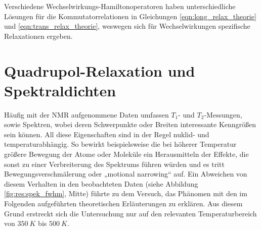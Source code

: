 Verschiedene Wechselwirkungs-Hamiltonoperatoren haben unterschiedliche Lösungen für die Kommutatorrelationen in Gleichungen \eqref{eqn:long_relax_theorie} und \eqref{eqn:trans_relax_theorie}, weswegen sich für Wechselwirkungen spezifische Relaxationen ergeben.




\section{Quadrupol-Relaxation und Spektraldichten} \label{section:theo:eckert}

Häufig mit der NMR aufgenommene Daten umfassen $T_1$- und $T_2$-Messungen, sowie Spektren, wobei deren Schwerpunkte oder Breiten interessante Kenngrößen sein können. All diese Eigenschaften sind in der Regel nuklid- und temperaturabhängig. So bewirkt beispielsweise die bei höherer Temperatur größere Bewegung der Atome oder Moleküle ein Herausmitteln der Effekte, die sonst zu einer Verbreiterung des Spektrums führen würden und es tritt Bewegungsverschmälerung oder „motional narrowing“ auf. Ein Abweichen von diesem Verhalten in den beobachteten Daten (siehe Abbildung \ref{fig:res:spek_fwhm}, Mitte) führte zu dem Versuch, das Phänomen mit den im Folgenden aufgeführten theoretischen Erläuterungen zu erklären. Aus diesem Grund erstreckt sich die Untersuchung nur auf den relevanten Temperaturbereich von $\SI{350}{K}$ bis $\SI{500}{K}$.

